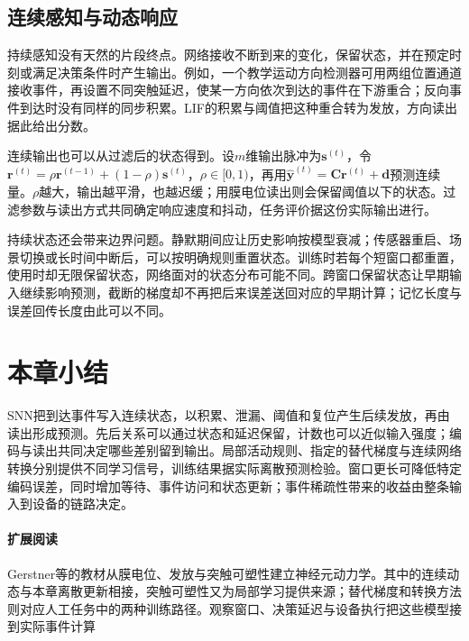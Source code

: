 \subsection{连续感知与动态响应}
\label{sec:snn-continuous-response}

持续感知没有天然的片段终点。网络接收不断到来的变化，保留状态，并在预定时刻或满足决策条件时产生输出。例如，一个教学运动方向检测器可用两组位置通道接收事件，再设置不同突触延迟，使某一方向依次到达的事件在下游重合；反向事件到达时没有同样的同步积累。LIF的积累与阈值把这种重合转为发放，方向读出据此给出分数。

连续输出也可以从过滤后的状态得到。设$m$维输出脉冲为$\bm s^{(t)}$，令$\bm r^{(t)}=\rho\bm r^{(t-1)}+(1-\rho)\bm s^{(t)}$，$\rho\in[0,1)$，再用$\hat{\bm y}^{(t)}=\bm C\bm r^{(t)}+\bm d$预测连续量。$\rho$越大，输出越平滑，也越迟缓；用膜电位读出则会保留阈值以下的状态。过滤参数与读出方式共同确定响应速度和抖动，任务评价据这份实际输出进行。

持续状态还会带来边界问题。静默期间应让历史影响按模型衰减；传感器重启、场景切换或长时间中断后，可以按明确规则重置状态。训练时若每个短窗口都重置，使用时却无限保留状态，网络面对的状态分布可能不同。跨窗口保留状态让早期输入继续影响预测，截断的梯度却不再把后来误差送回对应的早期计算；记忆长度与误差回传长度由此可以不同。

\section{本章小结}
\label{sec:snn-summary}

SNN把到达事件写入连续状态，以积累、泄漏、阈值和复位产生后续发放，再由读出形成预测。先后关系可以通过状态和延迟保留，计数也可以近似输入强度；编码与读出共同决定哪些差别留到输出。局部活动规则、指定的替代梯度与连续网络转换分别提供不同学习信号，训练结果据实际离散预测检验。窗口更长可降低特定编码误差，同时增加等待、事件访问和状态更新；事件稀疏性带来的收益由整条输入到设备的链路决定。

\paragraph{扩展阅读}
Gerstner等的教材从膜电位、发放与突触可塑性建立神经元动力学。其中的连续动态与本章离散更新相接，突触可塑性又为局部学习提供来源；替代梯度和转换方法则对应人工任务中的两种训练路径。观察窗口、决策延迟与设备执行把这些模型接到实际事件计算
